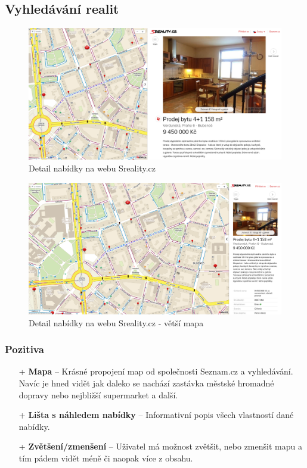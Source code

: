 
\newpage
\subsection{Vyhledávání realit}
\begin{figure}[h]
    \centering
    \includegraphics[width=1.0\textwidth]{media/sreality/detail.png}
    \caption{Detail nabídky na webu Sreality.cz}
    \label{fig:sreality:detail}
\end{figure}
\begin{figure}[h]
    \centering
    \includegraphics[width=1.0\textwidth]{media/sreality/detail-big-map.png}
    \caption{Detail nabídky na webu Sreality.cz - větší mapa}
    \label{fig:sreality:detail-big-map}
\end{figure}
\subsubsection*{Pozitiva}
\begin{itemize}
    \item[+] \textbf{Mapa} -- Krásné propojení map od společnosti Seznam.cz a vyhledávání. Navíc je hned vidět jak daleko se nachází zastávka městské hromadné dopravy nebo nejbližší supermarket a další.
    \item[+] \textbf{Lišta s náhledem nabídky} -- Informativní popis všech vlastností dané nabídky.
    \item[+] \textbf{Zvětšení/zmenšení} -- Uživatel má možnost zvětšit, nebo zmenšit mapu a tím pádem vidět méně či naopak více z obsahu.
\end{itemize}
